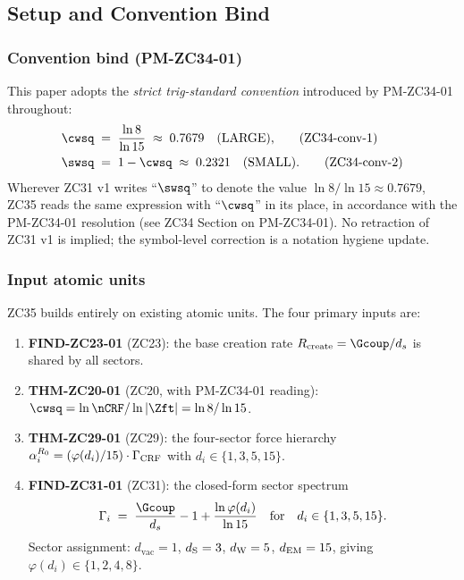 \documentclass[12pt, a4paper]{article}
\begin{document}
\subsection{Setup and Convention Bind}
\label{sec:setup}

\subsubsection{Convention bind (PM-ZC34-01)}

This paper adopts the \emph{strict trig-standard convention} introduced
by PM-ZC34-01 throughout:
\begin{align}
  \cwsq &\;=\; \frac{\ln 8}{\ln 15} \;\approx\; 0.7679 \quad\text{(LARGE),}
  \tag{ZC34-conv-1}\label{eq:zc34conv1}\\
  \swsq &\;=\; 1 - \cwsq \;\approx\; 0.2321 \quad\text{(SMALL).}
  \tag{ZC34-conv-2}\label{eq:zc34conv2}
\end{align}
Wherever ZC31 v1 writes ``$\swsq$'' to denote the value
$\ln 8/\ln 15 \approx 0.7679$, ZC35 reads the same expression with
``$\cwsq$'' in its place, in accordance with the PM-ZC34-01 resolution
(see ZC34 Section on PM-ZC34-01). No retraction of ZC31 v1 is implied;
the symbol-level correction is a notation hygiene update.

\subsubsection{Input atomic units}

ZC35 builds entirely on existing atomic units. The four primary inputs
are:

\begin{keybox}[title={Input atomic units used by ZC35}]
\begin{enumerate}[leftmargin=*, noitemsep]
  \item \textbf{FIND-ZC23-01} (ZC23): the base creation rate
        $R_{\rm create} = \Gcoup/d_s$ is shared by all sectors.
  \item \textbf{THM-ZC20-01} (ZC20, with PM-ZC34-01 reading):
        $\cwsq = \ln \nCRF / \ln|\Zft| = \ln 8 / \ln 15$.
  \item \textbf{THM-ZC29-01} (ZC29): the four-sector force hierarchy
        $\alpha_i^{R_0} = (\varphi(d_i)/15)\cdot\Gamma_{\rm CRF}$
        with $d_i \in \{1,3,5,15\}$.
  \item \textbf{FIND-ZC31-01} (ZC31): the closed-form sector spectrum
        \[
          \Gamma_i \;=\; \frac{\Gcoup}{d_s} - 1 + \frac{\ln\varphi(d_i)}{\ln 15}
          \quad\text{for}\quad d_i \in \{1,3,5,15\}.
        \]
        Sector assignment: $d_{\text{vac}}=1$, $d_{\rm S}=3$, $d_{\rm W}=5$,
        $d_{\rm EM}=15$, giving
        $\varphi(d_i) \in \{1, 2, 4, 8\}$.
\end{enumerate}
\end{keybox}
\end{document}

